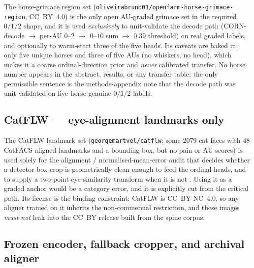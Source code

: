 The horse-grimace region set
(\texttt{oliveirabruno01/openfarm-horse-grimace-region}, CC~BY~4.0) is the only
open AU-graded grimace set in the required $0/1/2$ shape, and it is used
\emph{exclusively} to unit-validate the decode path
(CORN-decode $\rightarrow$ per-AU $0$--$2$ $\rightarrow$ $0$--$10$ sum
$\rightarrow$ $0.39$ threshold) on real graded labels, and optionally to
warm-start three of the five heads. Its caveats are baked in: only five unique
horses and three of five AUs (no whiskers, no head), which makes it a coarse
ordinal-direction prior and \emph{never} calibrated transfer. No horse number
appears in the abstract, results, or any transfer table; the only permissible
sentence is the methods-appendix note that the decode path was unit-validated on
five-horse genuine $0/1/2$ labels.

\subsection{CatFLW --- eye-alignment landmarks only}
\label{subsec:catflw}

The CatFLW landmark set (\texttt{georgemartvel/catflw}; some $2079$ cat faces
with $48$ CatFACS-aligned landmarks and a bounding box, but no pain or AU
scores) is used solely for the alignment / normalised-mean-error audit that
decides whether a detector box crop is geometrically clean enough to feed the
ordinal heads, and to supply a two-point eye-similarity transform when it is not
\citep{martvel2024catflw}. Using it as a graded anchor would be a category
error, and it is explicitly cut from the critical path. Its license is the
binding constraint: CatFLW is CC~BY-NC~4.0, so any aligner trained on it inherits
the non-commercial restriction, and these images \emph{must not} leak into the
CC~BY release built from the spine corpus.

\subsection{Frozen encoder, fallback cropper, and archival aligner}

